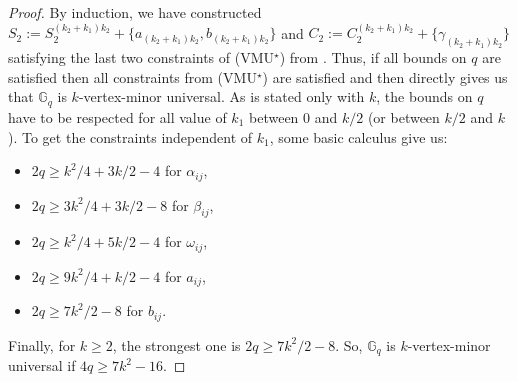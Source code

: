 \documentclass[a4paper,UKenglish,cleveref, autoref, thm-restate]{arxiv}
\newcommand{\gs}{\geqslant}
\newcommand{\G}[1][q]{\mathbb{G}_{#1}}
\begin{document}
\begin{proof}
        
        By induction, we have constructed $S_2 := S_2^{(k_2+k_1)k_2} + \{a_{(k_2+k_1)k_2}, b_{(k_2+k_1)k_2}\}$ and $C_2 := C_2^{(k_2+k_1)k_2} + \{\gamma_{(k_2+k_1)k_2}\}$ satisfying the last two constraints of (VMU$^\star$) from . Thus, if all bounds on $q$ are satisfied then all constraints from (VMU$^\star$) are satisfied and then  directly gives us that $\G$ is $k$-vertex-minor universal. As  is stated only with $k$, the bounds on $q$ have to be respected for all value of $k_1$ between 0 and $k/2$ (or between $k/2$ and $k$). To get the constraints independent of $k_1$, some basic calculus give us:
        \begin{itemize}
            \item  $2q \gs k^2/4 + 3k/2 -4$ for $\alpha_{ij}$,
            \item $2q \gs 3k^2/4 + 3k/2 - 8$ for $\beta_{ij}$,
            \item $2q \gs k^2/4+5k/2-4$ for $\omega_{ij}$,
            \item $2q \gs 9k^2/4+k/2-4$ for $a_{ij}$,
            \item $2q \gs 7k^2/2-8$ for $b_{ij}$.
        \end{itemize}
        Finally, for $k \gs 2$, the strongest one is $2q \gs 7k^2/2-8$. So, $\G$ is $k$-vertex-minor universal if $4q \gs 7k^2-16$. 
    \end{proof}
\end{document}
